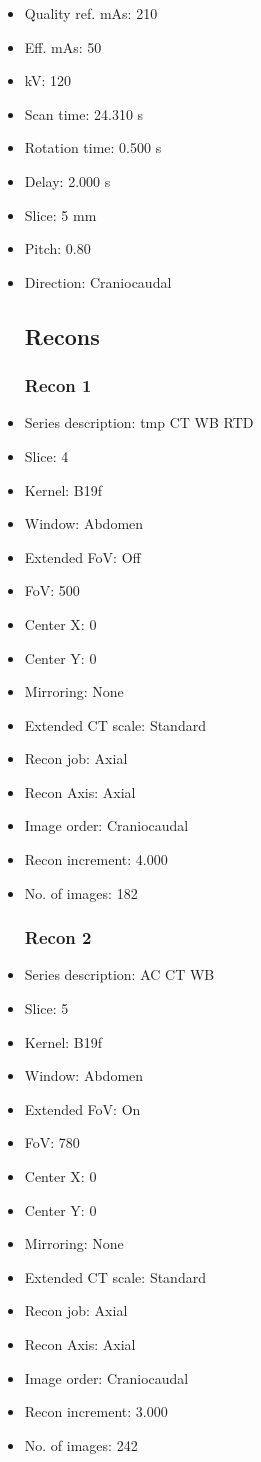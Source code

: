 \documentclass[12pt]{article}
\begin{document}
\begin{itemize}
\subsection{Scan}
\item Quality ref. mAs: 210\item Eff. mAs: 50\item kV: 120\item Scan time: 24.310 s\item Rotation time: 0.500 s\item Delay: 2.000 s\item Slice: 5 mm\item Pitch: 0.80\item Direction: Craniocaudal\subsection{Recons}

\subsubsection{Recon 1}
\item Series description: tmp CT WB RTD
\item Slice: 4
\item Kernel: B19f
\item Window: Abdomen
\item Extended FoV: Off
\item FoV: 500
\item Center X: 0
\item Center Y: 0
\item Mirroring: None
\item Extended CT scale: Standard
\item Recon job: Axial
\item Recon Axis: Axial
\item Image order: Craniocaudal
\item Recon increment: 4.000
\item No. of images: 182
\subsubsection{Recon 2}
\item Series description: AC CT WB
\item Slice: 5
\item Kernel: B19f
\item Window: Abdomen
\item Extended FoV: On
\item FoV: 780
\item Center X: 0
\item Center Y: 0
\item Mirroring: None
\item Extended CT scale: Standard
\item Recon job: Axial
\item Recon Axis: Axial
\item Image order: Craniocaudal
\item Recon increment: 3.000
\item No. of images: 242

\end{itemize}
\end{document}

